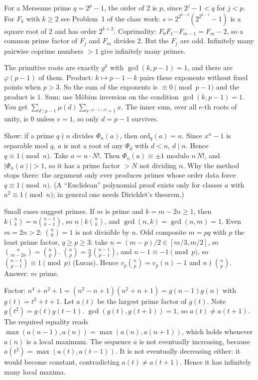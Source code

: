 \documentclass[11pt,a4paper]{article}
\begin{document}
 For a Mersenne prime $q=2^p-1$, the order of $2$ is $p$, since $2^j-1<q$ for $j<p$. For $F_k$ with $k\ge2$ see Problem~1 of the class work: $s=2^{2^{k-2}}(2^{2^{k-1}}-1)$ is a square root of $2$ and has order $2^{k+2}$.
 Coprimality: $F_0F_1\cdots F_{m-1}=F_m-2$, so a common prime factor of $F_j$ and $F_m$ divides $2$. But the $F_j$ are odd. Infinitely many pairwise coprime numbers $>1$ give infinitely many primes.

 The primitive roots are exactly $g^k$ with $\gcd(k,p-1)=1$, and there are $\varphi(p-1)$ of them.
 Product: $k\mapsto p-1-k$ pairs these exponents without fixed points when $p>3$. So the sum of the exponents is $\equiv0\pmod{p-1}$ and the product is $1$.
 Sum: use M\"obius inversion on the condition $\gcd(k,p-1)=1$. You get $\sum_{d\mid p-1}\mu(d)\sum_{x^{(p-1)/d}=1}x$. The inner sum, over all $e$-th roots of unity, is $0$ unless $e=1$, so only $d=p-1$ survives.

 Show: if a prime $q\nmid n$ divides $\Phi_n(a)$, then $\mathrm{ord}_q(a)=n$. Since $x^n-1$ is separable mod $q$, $a$ is not a root of any $\Phi_d$ with $d<n$, $d\mid n$. Hence $q\equiv1\pmod n$.
 Take $a=n\cdot N!$. Then $\Phi_n(a)\equiv\pm1$ modulo $n\,N!$, and $|\Phi_n(a)|>1$, so it has a prime factor $>N$ not dividing $n$. Why the method stops there: the argument only ever produces primes whose order data force $q\equiv1\pmod n$. (A ``Euclidean'' polynomial proof exists only for classes $a$ with $a^2\equiv1\pmod n$; in general one needs Dirichlet's theorem.)

 Small cases suggest primes. If $m$ is prime and $k=m-2n\ge1$, then $k\binom nk=n\binom{n-1}{k-1}$, so $n\mid k\binom nk$, and $\gcd(n,k)=\gcd(n,m)=1$.
 Even $m=2n>2$: $\binom n0=1$ is not divisible by $n$. Odd composite $m=pq$ with $p$ the least prime factor, $q\ge p\ge3$: take $n=(m-p)/2\in[m/3,m/2]$, so $\binom{n}{m-2n}=\binom np$.
 $\binom np=\frac np\binom{n-1}{p-1}$, and $n-1\equiv-1\pmod p$, so $\binom{n-1}{p-1}\equiv1\pmod p$ (Lucas). Hence $v_p\binom np=v_p(n)-1$ and $n\nmid\binom np$. Answer: $m$ prime.

 Factor: $n^4+n^2+1=(n^2-n+1)(n^2+n+1)=g(n-1)g(n)$ with $g(t)=t^2+t+1$. Let $a(t)$ be the largest prime factor of $g(t)$. Note $g(t^2)=g(t)g(t-1)$.
 $\gcd(g(t),g(t+1))=1$, so $a(t)\ne a(t+1)$. The required equality reads $\max(a(n-1),a(n))=\max(a(n),a(n+1))$, which holds whenever $a(n)$ is a local maximum.
 The sequence $a$ is not eventually increasing, because $a(t^2)=\max(a(t),a(t-1))$. It is not eventually decreasing either: it would become constant, contradicting $a(t)\ne a(t+1)$. Hence it has infinitely many local maxima.
\end{document}
